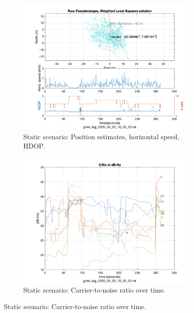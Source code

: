         \begin{figure}[h!]
            \centering
            \begin{subfigure}{0.23\textwidth}
                \centering
                \includegraphics[width=\textwidth]{images/Monte_Cappuccini/filtered/Samsung_A51_Monte_Cappuccini_fig4.png}
                \caption{Static scenario: Position estimates, horizontal speed, HDOP.}
                \label{fig:static_pos}
            \end{subfigure}
            \hfill
            \begin{subfigure}{0.23\textwidth}
                \centering
                \includegraphics[width=\textwidth]{images/Monte_Cappuccini/filtered/Samsung_A51_Monte_Cappuccini_fig3.png}
                \caption{Static scenario: Carrier-to-noise ratio over time.}
                \label{fig:static_cno}
            \end{subfigure}
            \vspace{0.35cm}
            \label{fig:gnss_comparison}
          \end{figure}

